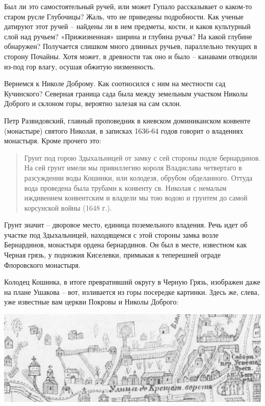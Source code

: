 Был ли это самостоятельный ручей, или может Гупало рассказывает о каком-то старом русле Глубочицы? Жаль, что не приведены подробности. Как ученые датируют этот ручей – найдены ли в нем предметы, кости, и каков культурный слой над ручьем? «Прижизненная» ширина и глубина ручья? На какой глубине обнаружен? Получается слишком много длинных ручьев, параллельно текущих в сторону Почайны. Хотя может, в древности так оно и было – канавами отводили из-под гор влагу, осушая обжитую низменность.

Вернемся к Николе Доброму. Как соотносился с ним на местности сад Кучинского? Северная граница сада была между земельным участком Николы Доброго и склоном горы, вероятно залезая на сам склон.

Петр Развидовский, главный проповедник в киевском доминиканском конвенте (монастыре) святого Николая, в записках 1636-64 годов говорит о владениях монастыря. Кроме прочего это: 

\begin{quotation}
Грунт под горою Здыхальницей от замку с сей стороны подле бернардинов. На сей грунт имели мы привиллегию короля Владислава четвертаго в разсуждении воды Кошинки, или колодезя, обрубом обделанного. Оттуда вода проведена была трубами к конвенту св. Николая с немалым иждивением конвентским и владели мы тою водою и грунтем до самой корсунской войны (1648 г.).
\end{quotation}

Грунт значит – дворовое место, единица поземельного владения. Речь идет об участке под Здыхальницей, находящемся с этой стороны замка возле Бернардинов, монастыря ордена бернардинов. Он был в месте, известном как Черная грязь, у подножия Киселевки, примыкая к теперешней ограде Флоровского монастыря.

Колодец Кошинка, в итоге превративший округу в Черную Грязь, изображен даже на плане Ушакова – вот, изливается из горы посередке картинки. Здесь же, слева, уже известные вам церкви Покровы и Николы Доброго:

\begin{center}
\includegraphics[width=\linewidth]{chast-colebanie-osnov/borichev-tok/s_koshinka.jpg}
\end{center}

